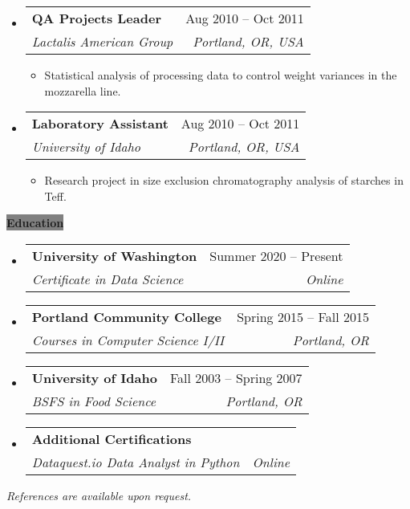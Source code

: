 \documentclass[letterpaper,12pt]{article}[leftmargin=*]
\makeatletter
\def \entryspacing {-0pt}
\newcommand{\education}[2]{\vspace{6pt}
  \colorbox{Grey}{\color{white}\raggedbottom\normalsize\textbf{{#1}{\hspace{9pt}#2\hspace{4pt}}}}
}
\newcommand{\resumeEntryStart}{\begin{itemize}[leftmargin=2.5mm]}
\newcommand{\resumeEntryEnd}{\end{itemize}\vspace{\entryspacing}}
\newcommand{\resumeItemListStart}{\begin{itemize}[leftmargin=4.5mm]}
\newcommand{\resumeItemListEnd}{\end{itemize}}
\newcommand{\resumeItem}[1]{
  \item\small{
    {#1 \vspace{-2pt}}
  }
}
\newcommand{\resumeEntryTSDL}[4]{
  \vspace{-1pt}\item[]
    \begin{tabularx}{0.97\textwidth}{X@{\hspace{60pt}}r}
      \textbf{\color{primary}#1} & {\firabook\color{accent}\small#2} \\
      \textit{\color{accent}\small#3} & \textit{\color{accent}\small#4} \\
    \end{tabularx}\vspace{-6pt}
}
\makeatother
\begin{document}
  \resumeEntryStart
    \resumeEntryTSDL
      {QA Projects Leader}{Aug 2010 -- Oct 2011}
      {Lactalis American Group}{Portland, OR, USA}
    \resumeItemListStart
      \resumeItem {Statistical analysis of processing data to control weight variances in the mozzarella line.}
    \resumeItemListEnd
  \resumeEntryEnd
  
  \resumeEntryStart
    \resumeEntryTSDL
      {Laboratory Assistant}{Aug 2010 -- Oct 2011}
      {University of Idaho}{Portland, OR, USA}
    \resumeItemListStart
      \resumeItem {Research project in size exclusion chromatography analysis of starches in Teff.}
    \resumeItemListEnd
  \resumeEntryEnd


\education{\faGraduationCap}{Education}

  \resumeEntryStart
    \resumeEntryTSDL
      {University of Washington}{Summer 2020 -- Present}
      {Certificate in Data Science}{Online}
    \resumeEntryTSDL
      {Portland Community College}{Spring 2015 -- Fall 2015}
      {Courses in Computer Science I/II}{Portland, OR}
    \resumeEntryTSDL
      {University of Idaho}{Fall 2003 -- Spring 2007}
      {BSFS in Food Science}{Portland, OR}
    \resumeEntryTSDL
      {Additional Certifications}{}
      {Dataquest.io Data Analyst in Python}{Online}
  \resumeEntryEnd
  
  \bigskip 
  
  \begin{center}
    \color{accent}\small{\textit{References are available upon request.}}
  \end{center}
\end{document}
